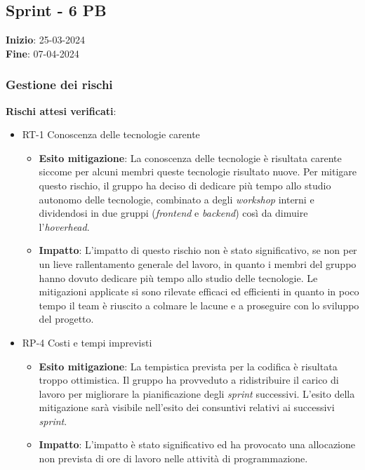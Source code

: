 \subsection{Sprint - 6 PB}
\textbf{Inizio}: 25-03-2024 \\
\textbf{Fine}: 07-04-2024

\subsubsection{Gestione dei rischi}
\textbf{Rischi attesi verificati}:

\begin{itemize}
	\item RT-1 Conoscenza delle tecnologie carente
	      \begin{itemize}
		      \item \textbf{Esito mitigazione}: La conoscenza delle tecnologie è risultata carente siccome per alcuni membri queste tecnologie risultato nuove.
		            Per mitigare questo rischio, il gruppo ha deciso di dedicare più tempo allo studio autonomo delle tecnologie, combinato a degli \textit{workshop} interni e dividendosi in due gruppi (\textit{frontend} e \textit{backend}) così da dimuire l'\textit{hoverhead}.
		      \item \textbf{Impatto}: L'impatto di questo rischio non è stato significativo, se non per un lieve rallentamento generale del lavoro, in quanto i membri del gruppo hanno dovuto dedicare più tempo allo studio delle tecnologie.
		            Le mitigazioni applicate si sono rilevate efficaci ed efficienti in quanto in poco tempo il team è riuscito a colmare le lacune e a proseguire con lo sviluppo del progetto.
	      \end{itemize}
	\item RP-4 Costi e tempi imprevisti
	      \begin{itemize}
		      \item \textbf{Esito mitigazione}: La tempistica prevista per la codifica è risultata troppo ottimistica. Il gruppo ha provveduto a ridistribuire il carico di lavoro per migliorare la pianificazione degli \textit{sprint} successivi. L'esito della mitigazione sarà visibile nell'esito dei consuntivi relativi ai successivi \textit{sprint}.
		      \item  \textbf{Impatto}: L'impatto è stato significativo ed ha provocato una allocazione non prevista di ore di lavoro nelle attività di programmazione. 
	      \end{itemize}
\end{itemize}

